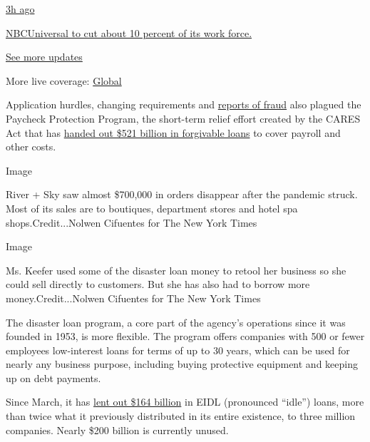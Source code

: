 \href{https://www.nytimes.com/live/2020/08/04/business/stock-market-today-coronavirus?action=click\&pgtype=Article\&state=default\&region=MAIN_CONTENT_1\&context=storylines_live_updates\#nbcuniversal-to-cut-about-10-percent-of-its-work-force}{3h
ago}

\href{https://www.nytimes.com/live/2020/08/04/business/stock-market-today-coronavirus?action=click\&pgtype=Article\&state=default\&region=MAIN_CONTENT_1\&context=storylines_live_updates\#nbcuniversal-to-cut-about-10-percent-of-its-work-force}{NBCUniversal
to cut about 10 percent of its work force.}

\href{https://www.nytimes.com/live/2020/08/04/business/stock-market-today-coronavirus?action=click\&pgtype=Article\&state=default\&region=MAIN_CONTENT_1\&context=storylines_live_updates}{See
more updates}

More live coverage:
\href{https://www.nytimes.com/2020/08/04/world/coronavirus-cases.html?action=click\&pgtype=Article\&state=default\&region=MAIN_CONTENT_1\&context=storylines_live_updates}{Global}

Application hurdles, changing requirements and
\href{https://www.nytimes.com/2020/07/27/us/lamborghini-ppp-covid-19.html}{reports
of fraud} also plagued the Paycheck Protection Program, the short-term
relief effort created by the CARES Act that has
\href{https://www.nytimes.com/2020/06/30/business/paycheck-protection-program-coronavirus.html}{handed
out \$521 billion in forgivable loans} to cover payroll and other costs.

Image

River + Sky saw almost \$700,000 in orders disappear after the pandemic
struck. Most of its sales are to boutiques, department stores and hotel
spa shops.Credit...Nolwen Cifuentes for The New York Times

Image

Ms. Keefer used some of the disaster loan money to retool her business
so she could sell directly to customers. But she has also had to borrow
more money.Credit...Nolwen Cifuentes for The New York Times

The disaster loan program, a core part of the agency's operations since
it was founded in 1953, is more flexible. The program offers companies
with 500 or fewer employees low-interest loans for terms of up to 30
years, which can be used for nearly any business purpose, including
buying protective equipment and keeping up on debt payments.

Since March, it has
\href{https://www.sba.gov/sites/default/files/2020-07/EIDL\%20COVID-19\%20Loan\%207.27.20-508.pdf}{lent
out \$164 billion} in EIDL (pronounced ``idle'') loans, more than twice
what it previously distributed in its entire existence, to three million
companies. Nearly \$200 billion is currently unused.

